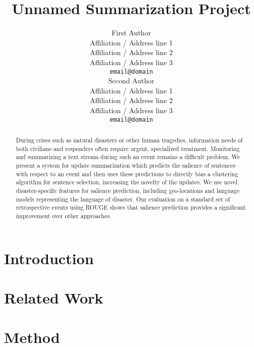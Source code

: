 \documentclass[11pt]{article}
\title{Unnamed Summarization Project}
\author{First Author \\
  Affiliation / Address line 1 \\
  Affiliation / Address line 2 \\
  Affiliation / Address line 3 \\
  {\tt email@domain} \\\And
  Second Author \\
  Affiliation / Address line 1 \\
  Affiliation / Address line 2 \\
  Affiliation / Address line 3 \\
  {\tt email@domain} \\}
\date{}
\begin{document}
\maketitle
\begin{abstract}
During crises such as natural disasters or other human tragedies, information
needs of both civilians and responders often require urgent, specialized
treatment.  
Monitoring and summarizing a text stream
during such an event remains a difficult problem. 
We present a system for update summarization which predicts the salience of 
sentences with respect to an event and then uses these
predictions to directly bias a clustering algorithm for sentence selection,
increasing the novelty of the updates. We use novel, disaster-specific features
for salience prediction, including geo-locations and language models
representing the language of disaster.
Our evaluation on a standard set of retrospective events using ROUGE shows 
that salience prediction provides a significant improvement over 
other approaches.



\end{abstract}

\section{Introduction}



\section{Related Work}


%

\section{Method}

\end{document}
